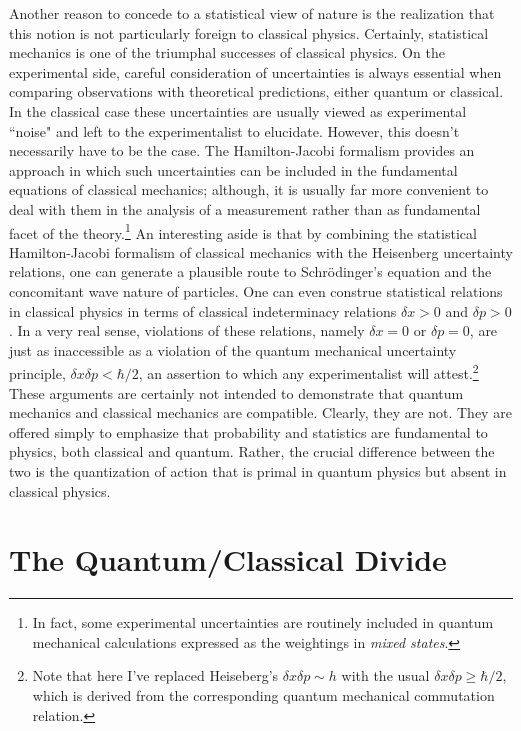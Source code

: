 \documentclass[12pt]{article}
\begin{document}
Another reason to concede to a statistical view of nature is the realization that this notion is not particularly foreign to classical physics.  Certainly, statistical mechanics is one of the triumphal successes of classical physics.  On the experimental side, careful consideration of uncertainties is always essential when comparing observations with theoretical predictions, either quantum or classical.  In the classical case these uncertainties are usually viewed as experimental ``noise" and left to the experimentalist to elucidate.  However, this doesn't necessarily have to be the case. The Hamilton-Jacobi formalism provides an approach in which such uncertainties can be included in the fundamental equations of classical mechanics\cite{Ha2005,HR2016}; although, it is usually far more convenient to deal with them in the analysis of a measurement rather than as fundamental facet of the theory.\footnote{In fact, some experimental uncertainties are routinely included in quantum mechanical calculations expressed as the weightings in {\it mixed states}.} An interesting aside is that by combining the statistical Hamilton-Jacobi formalism of classical mechanics with the Heisenberg uncertainty relations, one can generate a plausible route to Schr\"{o}dinger's equation and the concomitant wave nature of particles\cite{Ha2002,Bo2017}.   
One can even construe statistical relations in classical physics in terms of classical indeterminacy relations $\delta x > 0$ and $\delta p > 0$\cite{Vo2011}. In a very real sense, violations of these relations, namely $\delta x=0$ or $\delta p=0$, are just as inaccessible as a violation of the quantum mechanical uncertainty principle, $\delta x\delta p < \hbar/2$, an assertion to which any experimentalist will attest.\footnote{Note that here I've replaced Heiseberg's $\delta x \delta p \sim h$ with the usual $\delta x \delta p \geq \hbar/2$, which is derived from the corresponding quantum mechanical commutation relation.} These arguments are certainly not intended to demonstrate that quantum mechanics and classical mechanics are compatible.  Clearly, they are not.  They are offered simply to emphasize that probability and statistics are fundamental to physics, both classical and quantum.  Rather, the crucial difference between the two is the quantization of action that is primal in quantum physics but absent in classical physics.


\section{The Quantum/Classical Divide}\label{QCD}
\end{document}
